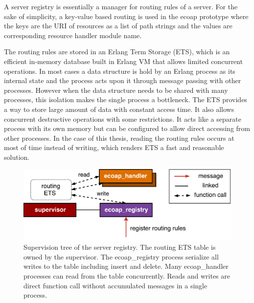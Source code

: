 A server registry is essentially a manager for routing rules of a server. For the sake of simplicity, a key-value based routing is used in the ecoap prototype where the keys are the URI of resources as a list of path strings and the values are corresponding resource handler module name. 

The routing rules are stored in an Erlang Term Storage (ETS), which is an efficient in-memory database built in Erlang VM that allows limited concurrent operations. In most cases a data structure is hold by an Erlang process as its internal state and the process acts upon it through message passing with other processes. However when the data structure needs to be shared with many processes, this isolation makes the single process a bottleneck. The ETS provides a way to store large amount of data with constant access time. It also allows concurrent destructive operations with some restrictions. It acts like a separate process with its own memory but can be configured to allow direct accessing from other processes. In the case of this thesis, reading the routing rules occurs at most of time instead of writing, which renders ETS a fast and reasonable solution. 

\begin{figure}[!htbp]
\centering
\includegraphics[scale = 0.55]{coap_registry}
\caption[Supervision tree of the server registry]{Supervision tree of the server registry. The routing ETS table is owned by the supervisor. The ecoap\_registry process serialize all writes to the table including insert and delete. Many ecoap\_handler processes can read from the table concurrently. Reads and writes are direct function call without accumulated messages in a single process.}
\label{fig:coap_registry}
\end{figure}
 
